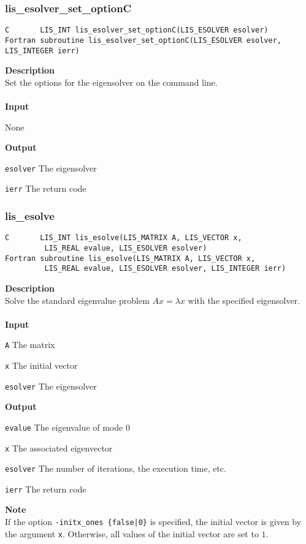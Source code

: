 \documentclass[a4paper]{article}
\newcommand{\namelistlabel}[1]{\mbox{#1}\hfill}
\newenvironment{namelist}[1]{%
\begin{list}{}
  {\let\makelabel\namelistlabel
  \settowidth{\labelwidth}{#1}
  \setlength{\leftmargin}{1.1\labelwidth}}
  }{%
\end{list}}
\begin{document}
\newpage
\subsubsection{lis\_esolver\_set\_optionC}
\begin{screen}
\verb|C       LIS_INT lis_esolver_set_optionC(LIS_ESOLVER esolver)|\\
\verb|Fortran subroutine lis_esolver_set_optionC(LIS_ESOLVER esolver, LIS_INTEGER ierr)|
\end{screen}
{\bf Description}\\
\indent
Set the options for the eigensolver on the command line.
\\ \\
\noindent
{\bf Input}
\begin{namelist}{XXXXXXXXXXXXXXXXXXXX}
\item[None]
\end{namelist}
{\bf Output}
\begin{namelist}{XXXXXXXXXXXXXXXXXXXX}
\item[\tt esolver] The eigensolver
\item[\tt ierr] The return code
\end{namelist}

\subsubsection{lis\_esolve}
\begin{screen}
\verb|C       LIS_INT lis_esolve(LIS_MATRIX A, LIS_VECTOR x,|\\ 
\verb|         LIS_REAL evalue, LIS_ESOLVER esolver)|\\
\verb|Fortran subroutine lis_esolve(LIS_MATRIX A, LIS_VECTOR x,|\\
\verb|         LIS_REAL evalue, LIS_ESOLVER esolver, LIS_INTEGER ierr)|
\end{screen}
{\bf Description}\\
\indent
Solve the standard eigenvalue problem $Ax = \lambda x$ with the specified eigensolver.
\\ \\
\noindent
{\bf Input}
\begin{namelist}{XXXXXXXXXXXXXXXXXXXX}
\item[\tt A] The matrix
\item[\tt x] The initial vector
\item[\tt esolver] The eigensolver
\end{namelist}
{\bf Output}
\begin{namelist}{XXXXXXXXXXXXXXXXXXXX}
\item[\tt evalue] The eigenvalue of mode 0
\item[\tt x] The associated eigenvector
\item[\tt esolver] The number of iterations, the execution time, etc.
\item[\tt ierr] The return code
\end{namelist}
{\bf Note}\\
\indent
If the option {\tt -initx\_ones \{false|0\}} is specified, the initial
vector is given by the argument {\tt x}.
Otherwise, all values of the initial vector are set to $1$. 
\end{document}
